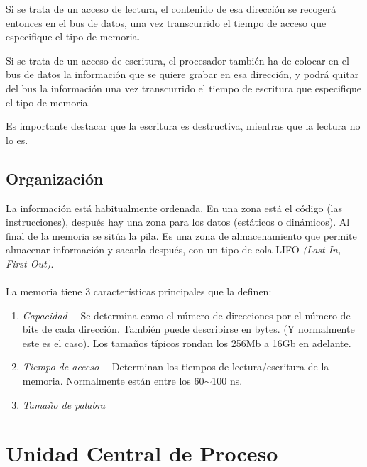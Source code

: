 \documentclass[a4paper,11pt,spanish]{report}
\begin{document}
Si se trata de un acceso de lectura, el contenido de esa dirección se recogerá entonces en el bus de datos, una vez transcurrido el tiempo de acceso que especifique el tipo de memoria.

Si se trata de un acceso de escritura, el procesador también ha de colocar en el bus de datos la información que se quiere grabar en esa dirección, y podrá quitar del bus la información una vez transcurrido el tiempo de escritura que especifique el tipo de memoria.

Es importante destacar que la escritura es destructiva, mientras que la lectura no lo es.
\subsection{Organización}
La información está habitualmente ordenada. En una zona está el código (las instrucciones), después hay una zona para los datos (estáticos o dinámicos). Al final de la memoria se sitúa la pila. Es una zona de almacenamiento que permite almacenar información y sacarla después, con un tipo de cola LIFO \emph{(Last In, First Out)}.
\\\\
La memoria tiene 3 características principales que la definen:
\begin{enumerate}
\item \emph{Capacidad}--- Se determina como el número de direcciones por el número de bits de cada dirección. También puede describirse en bytes. (Y normalmente este es el caso). Los tamaños típicos rondan los 256Mb a 16Gb en adelante.
\item \emph{Tiempo de acceso}--- Determinan los tiempos de lectura/escritura de la memoria. Normalmente están entre los 60$\sim$100 ns.
\item \emph{Tamaño de palabra}
\end{enumerate}
\section{Unidad Central de Proceso}
\end{document}

